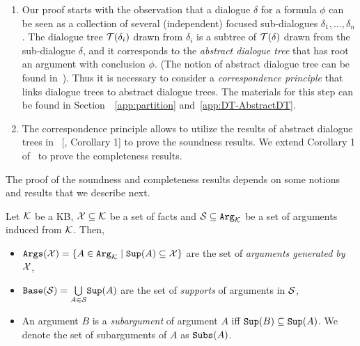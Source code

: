  \begin{enumerate}
    \item Our proof starts with the observation that a dialogue $\delta$ for a formula $\phi$ can be seen as a collection of several (independent) focused sub-dialogues $\delta_1, \ldots, \delta_n$. 
    The dialogue tree $\mathcal{T}(\delta_i)$ drawn from $\delta_i$ is a subtree of $\mathcal{T}(\delta)$ drawn from the sub-dialogue $\delta$, and it corresponds to the \emph{abstract dialogue tree} that has root an argument with conclusion $\phi$. 
    (The notion of abstract dialogue tree can be found in~\cite{loanho_2024}).
   Thus it is necessary to consider a \emph{correspondence principle} that links
    dialogue trees to abstract dialogue trees. The materials for this step can be found in Section~~\ref{app:partition} and~\ref{app:DT-AbstractDT}.
   
    \item The correspondence principle allows to utilize the results of abstract dialogue trees in ~[\cite{loanho_2024}, Corollary 1] to prove the soundness results. We extend Corollary 1 of~\cite{loanho_2024} to prove the completeness results.
\end{enumerate}

The proof of the soundness and completeness results depends on some notions and results that we describe next. 


\begin{notation} 
\label{not:arg}
Let $\mathcal{K}$ be a KB, $\mathcal{X} \subseteq \mathcal{K}$ be a set of facts and $\mathcal{S} \subseteq \texttt{\textup{Arg}}_{\mathcal{K}}$ be a set of arguments induced from $\mathcal{K}$. Then,
\begin{itemize}
    \item $\texttt{\textup{Args}}(\mathcal{X})  =  \{A \in \texttt{\textup{Arg}}_{\mathcal{K}} \mid \texttt{\textup{Sup}}(A)\subseteq \mathcal{X} \}$ are the set of \emph{arguments generated by} $\mathcal{X}$,


    \item $\texttt{\textup{Base}}(\mathcal{S})  =  \underset{A\in\mathcal{S}}{\bigcup}\texttt{\textup{Sup}}(A)$ are the set of \emph{supports} of arguments in $\mathcal{S}$,

    \item An argument $B$ is a \emph{subargument} of argument $A$ iff $\texttt{\textup{Sup}}(B)\subseteq \texttt{\textup{Sup}}(A)$. We denote the set of subarguments of $A$ as   $\texttt{\textup{Subs}}(A)$.
\end{itemize}
\end{notation}

